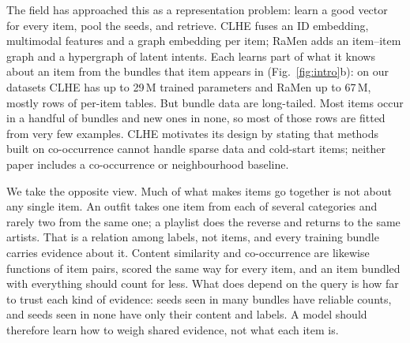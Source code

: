 \documentclass[runningheads]{llncs}
\begin{document}
The field has approached this as a representation problem: learn a good vector for every item, pool the seeds, and
retrieve. CLHE \cite{clhe} fuses an ID embedding, multimodal features and a graph embedding per item; RaMen
\cite{ramen} adds an item--item graph and a hypergraph of latent intents. Each learns part of what it knows about an
item from
the bundles that item appears in (Fig.~\ref{fig:intro}b): on our datasets CLHE has up to 29\,M trained parameters and
RaMen up to 67\,M, mostly rows of per-item tables. But bundle data are long-tailed. Most items occur in a handful of
bundles and new ones in none, so most of those rows are fitted from very few examples. CLHE motivates its design by
stating that methods built on co-occurrence cannot handle sparse data and cold-start items; neither paper includes a
co-occurrence or neighbourhood baseline.

We take the opposite view. Much of what makes items go together is not about any single item. An outfit takes one
item from each of several categories and rarely two from the same one; a playlist does the reverse and returns to the
same artists. That is a relation among labels, not items, and every training bundle carries evidence about it.
Content similarity and co-occurrence are likewise functions of item pairs, scored the same way for every item, and an
item bundled with everything should count for less. What does depend on the query is how far to trust each kind of
evidence: seeds seen in many bundles have reliable counts, and seeds seen in none have only their content and labels.
A model should therefore learn how to weigh shared evidence, not what each item is.
\end{document}

